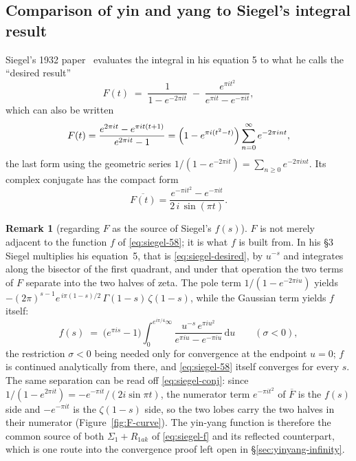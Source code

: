 \documentclass[11pt]{article}
\theoremstyle{definition}
\newtheorem{remark}[theorem]{Remark}
\begin{document}
\subsection{Comparison of yin and yang to Siegel's integral result}\label{sec:yinyang-siegel}

Siegel's 1932 paper~\cite{Siegel1932} evaluates the integral in his equation 5
to what he calls the ``desired result''
\begin{equation}\label{eq:siegel-desired}
F(t)\;=\;
\frac{1}{1-e^{-2\pi i t}}
\;-\;
\frac{e^{\pi i t^{2}}}{e^{\pi i t}-e^{-\pi i t}} ,
\end{equation}
which can also be written
\begin{equation}\label{eq:siegel-desired-alt}
F(t)
=\frac{e^{2\pi i t}-e^{\pi i t(t+1)}}{e^{2\pi i t}-1}
=\Bigl(1-e^{\pi i (t^{2}-t)}\Bigr)\sum_{n=0}^{\infty}e^{-2\pi i n t},
\end{equation}
the last form using the geometric series
$1/(1-e^{-2\pi i t})=\sum_{n\ge0}e^{-2\pi i n t}$. Its complex conjugate has
the compact form
\begin{equation}\label{eq:siegel-conj}
\overline{F(t)}
=\frac{e^{-\pi i t^{2}}-e^{-\pi i t}}{2\,i\,\sin(\pi t)} .
\end{equation}

\begin{remark}[regarding $F$ as the source of Siegel's $f(s)$]\label{rem:F-to-f}
$F$ is not merely adjacent to the function $f$ of \eqref{eq:siegel-58}; it is
what $f$ is built from. In his \S3 Siegel multiplies his equation~5, that is
\eqref{eq:siegel-desired}, by $u^{-s}$ and integrates along the bisector of the
first quadrant, and under that operation the two terms of $F$ separate into the
two halves of zeta. The pole term $1/(1-e^{-2\pi iu})$ yields
$-(2\pi)^{s-1}e^{\,i\pi(1-s)/2}\,\Gamma(1-s)\,\zeta(1-s)$, while the Gaussian
term yields $f$ itself:
\begin{equation}\label{eq:f-from-F}
f(s)\;=\;\bigl(e^{\pi i s}-1\bigr)
\int_{0}^{e^{i\pi/4}\infty}
\frac{u^{-s}\,e^{\pi i u^{2}}}{e^{\pi i u}-e^{-\pi i u}}\,\mathrm{d}u
\qquad (\sigma<0),
\end{equation}
the restriction $\sigma<0$ being needed only for convergence at the endpoint
$u=0$; $f$ is continued analytically from there, and \eqref{eq:siegel-58} itself
converges for every $s$. The same separation can be read off
\eqref{eq:siegel-conj}: since $1/(1-e^{2\pi it})=-e^{-\pi it}/(2i\sin\pi t)$,
the numerator term $e^{-\pi it^{2}}$ of $\overline{F}$ is the $f(s)$ side and
$-e^{-\pi it}$ is the $\zeta(1-s)$ side, so the two lobes carry the two halves
in their numerator (Figure~\ref{fig:F-curve}). The yin-yang function is therefore the common source of both
$\Sigma_1+R_{1ak}$ of \eqref{eq:siegel-f} and its reflected counterpart, which
is one route into the convergence proof left open in
\S\ref{sec:yinyang-infinity}.
\end{remark}
\end{document}
